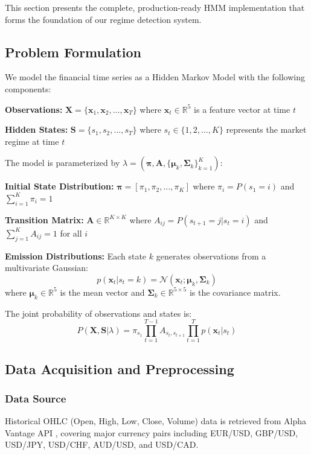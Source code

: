 \documentclass[conference]{IEEEtran}
\begin{document}
This section presents the complete, production-ready HMM implementation that forms the foundation of our regime detection system.

\subsection{Problem Formulation}
We model the financial time series as a Hidden Markov Model with the following components:

\textbf{Observations:} $\mathbf{X} = \{\mathbf{x}_1, \mathbf{x}_2, \ldots, \mathbf{x}_T\}$ where $\mathbf{x}_t \in \mathbb{R}^5$ is a feature vector at time $t$

\textbf{Hidden States:} $\mathbf{S} = \{s_1, s_2, \ldots, s_T\}$ where $s_t \in \{1, 2, \ldots, K\}$ represents the market regime at time $t$

The model is parameterized by $\lambda = (\boldsymbol{\pi}, \mathbf{A}, \{\boldsymbol{\mu}_k, \boldsymbol{\Sigma}_k\}_{k=1}^K)$:

\textbf{Initial State Distribution:} $\boldsymbol{\pi} = [\pi_1, \pi_2, \ldots, \pi_K]$ where $\pi_i = P(s_1 = i)$ and $\sum_{i=1}^{K}\pi_i = 1$

\textbf{Transition Matrix:} $\mathbf{A} \in \mathbb{R}^{K \times K}$ where $A_{ij} = P(s_{t+1}=j | s_t=i)$ and $\sum_{j=1}^{K}A_{ij} = 1$ for all $i$

\textbf{Emission Distributions:} Each state $k$ generates observations from a multivariate Gaussian:
\begin{equation}
p(\mathbf{x}_t | s_t=k) = \mathcal{N}(\mathbf{x}_t; \boldsymbol{\mu}_k, \boldsymbol{\Sigma}_k)
\end{equation}
where $\boldsymbol{\mu}_k \in \mathbb{R}^5$ is the mean vector and $\boldsymbol{\Sigma}_k \in \mathbb{R}^{5 \times 5}$ is the covariance matrix.

The joint probability of observations and states is:
\begin{equation}
P(\mathbf{X}, \mathbf{S} | \lambda) = \pi_{s_1} \prod_{t=1}^{T-1} A_{s_t, s_{t+1}} \prod_{t=1}^{T} p(\mathbf{x}_t | s_t)
\end{equation}

\subsection{Data Acquisition and Preprocessing}

\subsubsection{Data Source}
Historical OHLC (Open, High, Low, Close, Volume) data is retrieved from Alpha Vantage API \cite{alphavantage}, covering major currency pairs including EUR/USD, GBP/USD, USD/JPY, USD/CHF, AUD/USD, and USD/CAD.
\end{document}
